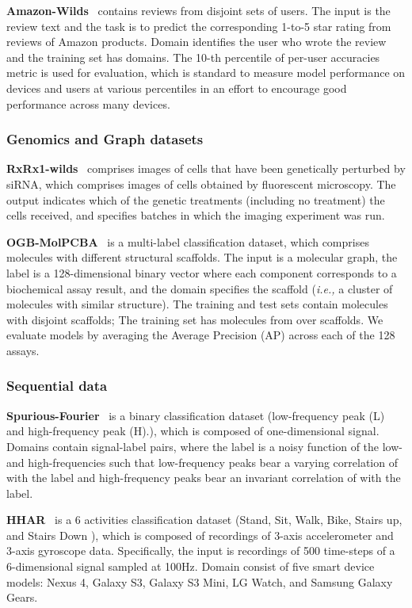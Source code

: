 \documentclass{article} \usepackage{iclr2023_conference,times}
\newcommand{\ie}[0]{\textit{i.e., }}
\begin{document}
\noindent \textbf{Amazon-Wilds}~\citep{koh2021wilds} contains  reviews from disjoint sets of users. The input is the review text and the task is to predict the corresponding 1-to-5 star rating from reviews of Amazon products. Domain  identifies the user who wrote the review and the training set has  domains. The 10-th percentile of per-user accuracies metric is used for evaluation, which is standard to measure model performance on devices and users at various percentiles in an effort to encourage good performance across many devices.
 
\subsubsection{Genomics and Graph datasets}


\noindent\textbf{RxRx1-wilds}~\citep{koh2021wilds} comprises images of cells that have been genetically perturbed by siRNA, which comprises  images of cells obtained by fluorescent microscopy. The output  indicates which of the  genetic treatments (including no treatment) the cells received, and  specifies  batches in which the imaging experiment was run.

\noindent\textbf{OGB-MolPCBA}~\citep{koh2021wilds} is a multi-label classification dataset, which comprises  molecules with  different structural scaffolds. The input is a molecular graph, the label is a 128-dimensional binary vector where each component corresponds to a biochemical assay result, and the domain  specifies the scaffold (\ie a cluster of molecules with similar structure). The training and test sets contain molecules with disjoint scaffolds; The training set has molecules from over  scaffolds. We evaluate models by averaging the Average Precision (AP) across each of the 128 assays.

\subsubsection{Sequential data}

\noindent\textbf{Spurious-Fourier}~\citep{gagnon2022woods} is a binary classification dataset (low-frequency peak (L) and high-frequency peak (H).), which is composed of one-dimensional signal. Domains  contain signal-label pairs, where the label is a noisy function of the low- and high-frequencies such that low-frequency peaks bear a varying correlation of  with the label and high-frequency peaks bear an invariant correlation of  with the label.

\noindent\textbf{HHAR}~\citep{gagnon2022woods} is a 6 activities classification dataset (Stand, Sit, Walk, Bike, Stairs up, and Stairs Down ), which is composed of recordings of 3-axis accelerometer and 3-axis gyroscope data. Specifically, the input  is recordings of 500 time-steps of a 6-dimensional signal sampled at 100Hz. Domain  consist of five smart device models: Nexus 4, Galaxy S3, Galaxy S3 Mini, LG Watch, and Samsung Galaxy Gears.  
\end{document}
